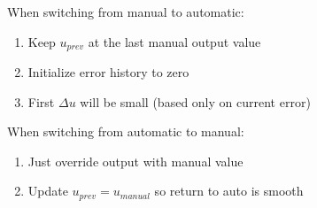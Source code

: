 \begin{example}
When switching from manual to automatic:
\begin{enumerate}
    \item Keep $u_{prev}$ at the last manual output value
    \item Initialize error history to zero
    \item First $\Delta u$ will be small (based only on current error)
\end{enumerate}

When switching from automatic to manual:
\begin{enumerate}
    \item Just override output with manual value
    \item Update $u_{prev} = u_{manual}$ so return to auto is smooth
\end{enumerate}
\end{example}

